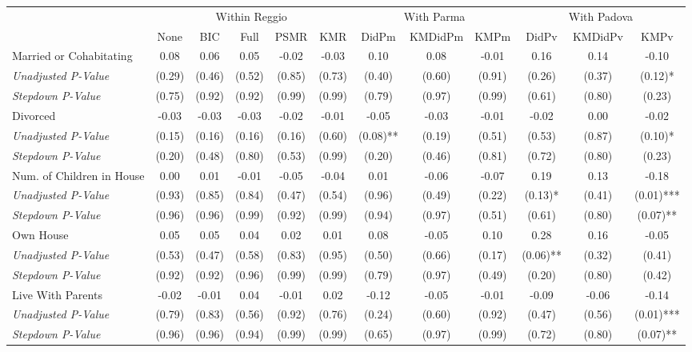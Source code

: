 \begin{tabular}{l c c c c c c c c c c c}
\toprule
& \multicolumn{5}{c}{Within Reggio} & \multicolumn{3}{c}{With Parma} & \multicolumn{3}{c}{With Padova} \\\cmidrule(lr){2-6} \cmidrule(lr){7-9} \cmidrule(lr){10-12}
 & None & BIC & Full & PSMR & KMR & DidPm & KMDidPm & KMPm & DidPv & KMDidPv & KMPv \\
\midrule
Married or Cohabitating & 0.08 & 0.06 & 0.05 & -0.02 & -0.03 & 0.10 & 0.08 & -0.01 & 0.16 & 0.14 & -0.10 \\
\quad \textit{Unadjusted P-Value} & (0.29) & (0.46) & (0.52) & (0.85) & (0.73) & (0.40) & (0.60) & (0.91) & (0.26) & (0.37) & (0.12)* \\
\quad \textit{Stepdown P-Value} & (0.75) & (0.92) & (0.92) & (0.99) & (0.99) & (0.79) & (0.97) & (0.99) & (0.61) & (0.80) & (0.23) \\
Divorced & -0.03 & -0.03 & -0.03 & -0.02 & -0.01 & -0.05 & -0.03 & -0.01 & -0.02 & 0.00 & -0.02 \\
\quad \textit{Unadjusted P-Value} & (0.15) & (0.16) & (0.16) & (0.16) & (0.60) & (0.08)** & (0.19) & (0.51) & (0.53) & (0.87) & (0.10)* \\
\quad \textit{Stepdown P-Value} & (0.20) & (0.48) & (0.80) & (0.53) & (0.99) & (0.20) & (0.46) & (0.81) & (0.72) & (0.80) & (0.23) \\
Num. of Children in House & 0.00 & 0.01 & -0.01 & -0.05 & -0.04 & 0.01 & -0.06 & -0.07 & 0.19 & 0.13 & -0.18 \\
\quad \textit{Unadjusted P-Value} & (0.93) & (0.85) & (0.84) & (0.47) & (0.54) & (0.96) & (0.49) & (0.22) & (0.13)* & (0.41) & (0.01)*** \\
\quad \textit{Stepdown P-Value} & (0.96) & (0.96) & (0.99) & (0.92) & (0.99) & (0.94) & (0.97) & (0.51) & (0.61) & (0.80) & (0.07)** \\
Own House & 0.05 & 0.05 & 0.04 & 0.02 & 0.01 & 0.08 & -0.05 & 0.10 & 0.28 & 0.16 & -0.05 \\
\quad \textit{Unadjusted P-Value} & (0.53) & (0.47) & (0.58) & (0.83) & (0.95) & (0.50) & (0.66) & (0.17) & (0.06)** & (0.32) & (0.41) \\
\quad \textit{Stepdown P-Value} & (0.92) & (0.92) & (0.96) & (0.99) & (0.99) & (0.79) & (0.97) & (0.49) & (0.20) & (0.80) & (0.42) \\
Live With Parents & -0.02 & -0.01 & 0.04 & -0.01 & 0.02 & -0.12 & -0.05 & -0.01 & -0.09 & -0.06 & -0.14 \\
\quad \textit{Unadjusted P-Value} & (0.79) & (0.83) & (0.56) & (0.92) & (0.76) & (0.24) & (0.60) & (0.92) & (0.47) & (0.56) & (0.01)*** \\
\quad \textit{Stepdown P-Value} & (0.96) & (0.96) & (0.94) & (0.99) & (0.99) & (0.65) & (0.97) & (0.99) & (0.72) & (0.80) & (0.07)** \\
\bottomrule
\end{tabular}
